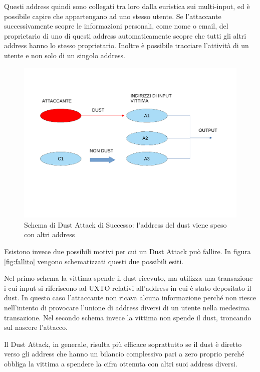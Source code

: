 Questi address quindi sono collegati tra loro dalla euristica sui multi-input, ed è possibile capire che appartengano ad uno stesso utente. Se l'attaccante successivamente scopre le informazioni personali, come nome o email, del proprietario di uno di questi address automaticamente scopre che tutti gli altri address hanno lo stesso proprietario. Inoltre è possibile tracciare l'attività di un utente e non solo di un singolo address.
\begin{figure}[h!]
    \centering
    \includegraphics[scale=0.5,trim = 1cm 6cm 0cm 3cm, clip]{Images/successo.pdf}
    \caption{Schema di Dust Attack di Successo: l'address del dust viene speso con altri address}
    \label{fig:success}
\end{figure}
\FloatBarrier
Esistono invece due possibili motivi per cui un Dust Attack può fallire. In figura \ref{fig:fallito} vengono schematizzati questi due possibili esiti.

Nel primo schema la vittima spende il dust ricevuto, ma utilizza una transazione i cui input si riferiscono ad UXTO relativi all'address in cui è stato depositato il dust. In questo caso l'attaccante non ricava alcuna informazione perché non riesce nell'intento di provocare l'unione di address diversi di un utente nella medesima transazione. Nel secondo schema invece la vittima non spende il dust, troncando sul nascere l'attacco. 

Il Dust Attack, in generale, risulta più efficace soprattutto se il dust è diretto verso gli address che hanno un bilancio complessivo pari a zero proprio perché obbliga la vittima a spendere la cifra ottenuta con altri suoi address diversi.

